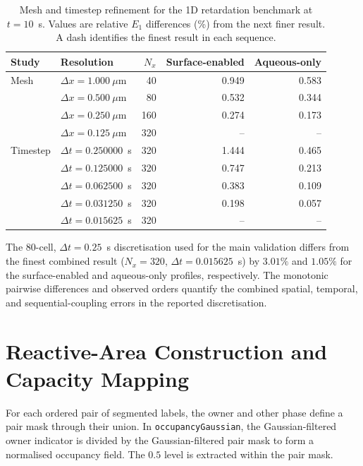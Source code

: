 \documentclass[pdflatex,sn-basic]{sn-jnl}
\begin{document}
\begin{table}[htbp]
    \centering
    \caption{Mesh and timestep refinement for the 1D retardation benchmark at
    $t=10$~s. Values are relative $E_1$ differences (\%) from the next finer
    result. A dash identifies the finest result in each sequence.}
    \label{tab:1dConvergence}
    \begin{tabular}{llrrr}
        \toprule
        Study & Resolution & $N_x$ & Surface-enabled & Aqueous-only \\
        \midrule
        Mesh & $\Delta x=1.000~\mu$m & 40  & 0.949 & 0.583 \\
             & $\Delta x=0.500~\mu$m & 80  & 0.532 & 0.344 \\
             & $\Delta x=0.250~\mu$m & 160 & 0.274 & 0.173 \\
             & $\Delta x=0.125~\mu$m & 320 & --    & --    \\
        \midrule
        Timestep & $\Delta t=0.250000$~s & 320 & 1.444 & 0.465 \\
                 & $\Delta t=0.125000$~s & 320 & 0.747 & 0.213 \\
                 & $\Delta t=0.062500$~s & 320 & 0.383 & 0.109 \\
                 & $\Delta t=0.031250$~s & 320 & 0.198 & 0.057 \\
                 & $\Delta t=0.015625$~s & 320 & --    & --    \\
        \bottomrule
    \end{tabular}
\end{table}

The $80$-cell, $\Delta t=0.25$~s discretisation used for the main validation
differs from the finest combined result
($N_x=320$, $\Delta t=0.015625$~s) by $3.01\%$ and $1.05\%$ for the
surface-enabled and aqueous-only profiles, respectively. The monotonic
pairwise differences and observed orders quantify the combined spatial,
temporal, and sequential-coupling errors in the reported discretisation.

\section{Reactive-Area Construction and Capacity Mapping}

For each ordered pair of segmented labels, the owner and other phase define
a pair mask through their union. In \texttt{occupancyGaussian}, the
Gaussian-filtered owner indicator is divided by the Gaussian-filtered pair
mask to form a normalised occupancy field. The $0.5$ level is extracted
within the pair mask.
\end{document}
